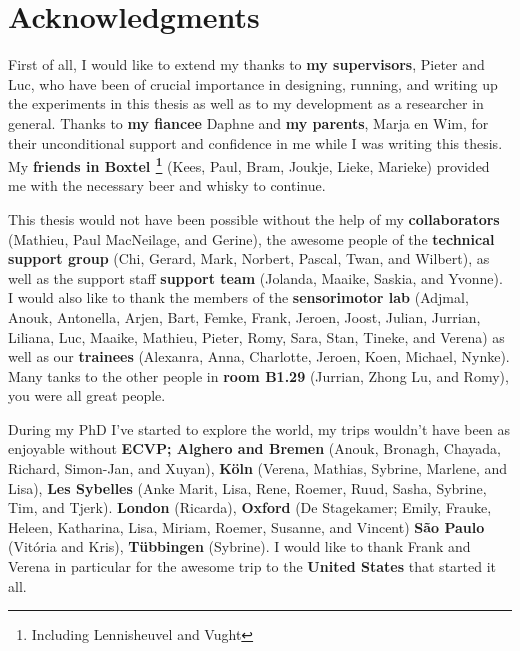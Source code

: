 \clearpage
\pagestyle{empty}

\chapter*{Acknowledgments}
{}

First of all, I would like to extend my thanks to \textbf{my supervisors}, Pieter and Luc, who have been of crucial importance in designing, running, and writing up the experiments in this thesis as well as to my development as a researcher in general. Thanks to \textbf{my fiancee} Daphne and \textbf{my parents}, Marja en Wim, for their unconditional support and confidence in me while I was writing this thesis. My \textbf{friends in Boxtel \footnote{Including Lennisheuvel and Vught}} (Kees, Paul, Bram, Joukje, Lieke, Marieke) provided me with the necessary beer and whisky to continue.


This thesis would not have been possible without the help of 
my \textbf{collaborators} (Mathieu, Paul MacNeilage, and Gerine),
the awesome people of the
\textbf{technical support group} (Chi, Gerard, Mark, Norbert, Pascal, Twan, and Wilbert),
as well as the support staff
\textbf{support team} (Jolanda, Maaike, Saskia, and Yvonne).
I would also like to thank the members of the 
\textbf{sensorimotor lab} (Adjmal, Anouk, Antonella, Arjen, Bart, Femke, Frank, Jeroen, Joost, Julian, Jurrian, Liliana, Luc, Maaike, Mathieu, Pieter, Romy, Sara, Stan, Tineke, and Verena) 
as well as our 
\textbf{trainees} (Alexanra, Anna, Charlotte, Jeroen, Koen, Michael, Nynke).
Many tanks to the other people in \textbf{room B1.29} (Jurrian, Zhong Lu, and Romy), you were all great people.


During my PhD I've started to explore the world, my trips wouldn't have been as enjoyable without 
\textbf{ECVP; Alghero and Bremen} (Anouk, Bronagh, Chayada, Richard, Simon-Jan, and Xuyan),
\textbf{K\"oln} (Verena, Mathias, Sybrine, Marlene, and Lisa),
\textbf{Les Sybelles} (Anke Marit, Lisa, Rene, Roemer, Ruud, Sasha, Sybrine, Tim, and Tjerk).
\textbf{London} (Ricarda),
\textbf{Oxford} (De Stagekamer; Emily, Frauke, Heleen, Katharina, Lisa, Miriam, Roemer, Susanne, and Vincent)
\textbf{S\~ao Paulo} (Vit\'oria and Kris),
\textbf{T\"ubbingen} (Sybrine).
I would like to thank Frank and Verena in particular for the awesome trip to the \textbf{United States} that started it all.




